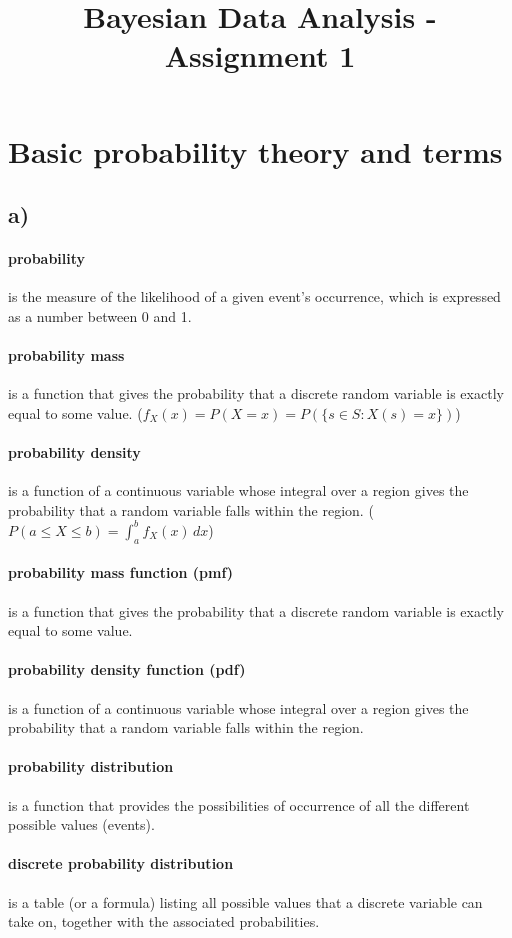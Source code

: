 \documentclass{article}
\title{\huge Bayesian Data Analysis - Assignment 1}
\begin{document}
 
  \maketitle 
  \section{Basic probability theory and terms} 
    \subsection*{a)} 
      \paragraph*{probability}is the measure of the likelihood of a given event's occurrence, which is expressed as a number between 0 and 1. 
      \paragraph*{probability mass}is a function that gives the probability that a discrete random variable is exactly equal to some value. ($f_{X}(x)=P(X=x)=P(\{s \in S:X(s)=x\})$)
      \paragraph*{probability density}is a function of a continuous variable whose integral over a region gives the probability that a random variable falls within the region. ($P(a \leqslant X \leqslant b)= \int_a^b f_{X}(x) \,dx$)
      \paragraph*{probability mass function (pmf)}is a function that gives the probability that a discrete random variable is exactly equal to some value.
      \paragraph*{probability density function (pdf)}is a function of a continuous variable whose integral over a region gives the probability that a random variable falls within the region.
      \paragraph*{probability distribution}is a function that provides the possibilities of occurrence of all the different possible values (events).
      \paragraph*{discrete probability distribution} is a table (or a formula) listing all possible values that a discrete variable can take on, together with the associated probabilities.
\end{document}
